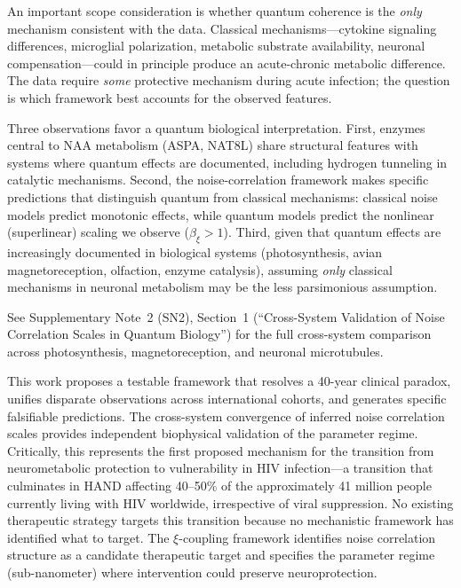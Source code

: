 \documentclass[10pt,a4paper]{article}
\begin{document}
An important scope consideration is whether quantum coherence is the \textit{only} mechanism consistent with the data. Classical mechanisms---cytokine signaling differences, microglial polarization, metabolic substrate availability, neuronal compensation---could in principle produce an acute-chronic metabolic difference. The data require \textit{some} protective mechanism during acute infection; the question is which framework best accounts for the observed features.

Three observations favor a quantum biological interpretation. First, enzymes central to NAA metabolism (ASPA, NAT8L) share structural features with systems where quantum effects are documented, including hydrogen tunneling in catalytic mechanisms. Second, the noise-correlation framework makes specific predictions that distinguish quantum from classical mechanisms: classical noise models predict monotonic effects, while quantum models predict the nonlinear (superlinear) scaling we observe ($\beta_\xi > 1$). Third, given that quantum effects are increasingly documented in biological systems (photosynthesis, avian magnetoreception, olfaction, enzyme catalysis), assuming \textit{only} classical mechanisms in neuronal metabolism may be the less parsimonious assumption.

See Supplementary Note~2 (SN2), Section~1 (``Cross-System Validation of Noise Correlation Scales in Quantum Biology'') for the full cross-system comparison across photosynthesis, magnetoreception, and neuronal microtubules.

This work proposes a testable framework that resolves a 40-year clinical paradox, unifies disparate observations across international cohorts, and generates specific falsifiable predictions. The cross-system convergence of inferred noise correlation scales provides independent biophysical validation of the parameter regime. Critically, this represents the first proposed mechanism for the transition from neurometabolic protection to vulnerability in HIV infection---a transition that culminates in HAND affecting 40--50\% of the approximately 41 million people currently living with HIV worldwide, irrespective of viral suppression. No existing therapeutic strategy targets this transition because no mechanistic framework has identified what to target. The $\xi$-coupling framework identifies noise correlation structure as a candidate therapeutic target and specifies the parameter regime (sub-nanometer) where intervention could preserve neuroprotection.
\end{document}
